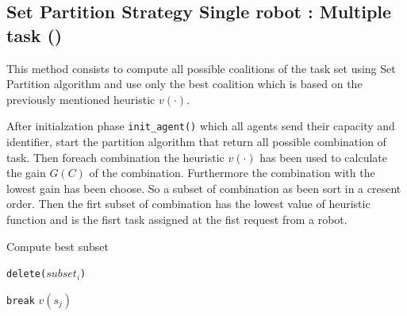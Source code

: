 \subsection{Set Partition Strategy Single robot : Multiple task (\sps)}

This method consists to compute all possible coalitions of the task set 
using Set Partition algorithm \cite{partition} and use only 
the best coalition which is based on the previously mentioned heuristic $v(\cdot)$.

After initialzation phase \texttt{init\_agent()} which all agents send their capacity and identifier,
start the partition algorithm \cite{partition} that return all possible combination 
of task.
Then foreach combination the heuristic $v(\cdot)$ has been used to calculate the gain $G(C)$ of the 
combination. Furthermore the combination with the lowest gain has been choose.
So a subset of combination as been sort in a cresent order. 
Then the firt subset of combination has the lowest value of heuristic function and 
is the fisrt task assigned at the fist request from a robot.

\begin{algorithm}
  \caption{Compute best subset} \label{SP}
  \begin{algorithmic}[1]
  \texttt{delete(}$subset_i$\texttt{)}
  
  \texttt{break}
  \EndIf
      $v(s_j)$ 
    \EndFor
  \EndFor
  \EndProcedure
  \end{algorithmic}
  \end{algorithm}

